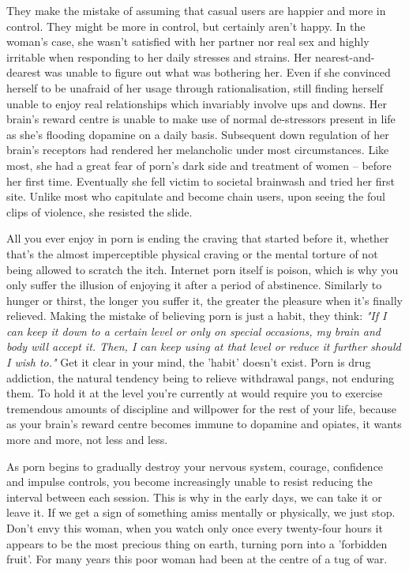 \documentclass[easypeasy]{subfiles}
\begin{document}
They make the mistake of assuming that casual users are happier and more in control. They might be more in control, but certainly aren't happy. In the woman's case, she wasn't satisfied with her partner nor real sex and highly irritable when responding to her daily stresses and strains. Her nearest-and-dearest was unable to figure out what was bothering her. Even if she convinced herself to be unafraid of her usage through rationalisation, still finding herself unable to enjoy real relationships which invariably involve ups and downs. Her brain's reward centre is unable to make use of normal de-stressors present in life as she's flooding dopamine on a daily basis. Subsequent down regulation of her brain's receptors had rendered her melancholic under most circumstances. Like most, she had a great fear of porn's dark side and treatment of women -- before her first time. Eventually she fell victim to societal brainwash and tried her first site. Unlike most who capitulate and become chain users, upon seeing the foul clips of violence, she resisted the slide.

All you ever enjoy in porn is ending the craving that started before it, whether that's the almost imperceptible physical craving or the mental torture of not being allowed to scratch the itch. Internet porn itself is poison, which is why you only suffer the illusion of enjoying it after a period of abstinence. Similarly to hunger or thirst, the longer you suffer it, the greater the pleasure when it's finally relieved. Making the mistake of believing porn is just a habit, they think: \textit{"If I can keep it down to a certain level or only on special occasions, my brain and body will accept it. Then, I can keep using at that level or reduce it further should I wish to."} Get it clear in your mind, the 'habit' doesn't exist. Porn is drug addiction, the natural tendency being to relieve withdrawal pangs, not enduring them. To hold it at the level you're currently at would require you to exercise tremendous amounts of discipline and willpower for the rest of your life, because as your brain's reward centre becomes immune to dopamine and opiates, it wants more and more, not less and less. 

As porn begins to gradually destroy your nervous system, courage, confidence and impulse controls, you become increasingly unable to resist reducing the interval between each session. This is why in the early days, we can take it or leave it. If we get a sign of something amiss mentally or physically, we just stop. Don't envy this woman, when you watch only once every twenty-four hours it appears to be the most precious thing on earth, turning porn into a 'forbidden fruit'. For many years this poor woman had been at the centre of a tug of war.
\end{document}
